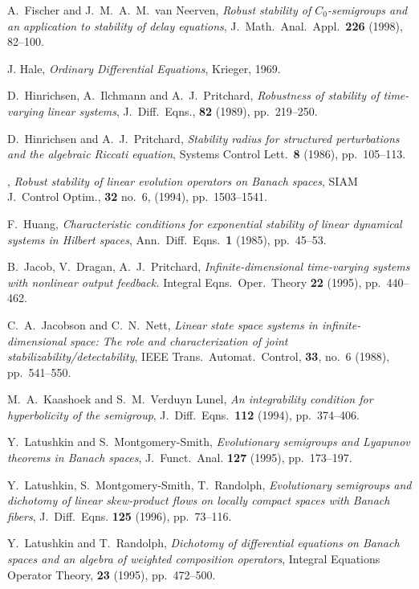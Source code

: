 \documentclass[10pt,psamsfonts,leqno]{siamltex}
\begin{document}
\begin{thebibliography}{99}
 {\sc A.~Fischer and J.~M.~A.~M.~van Neerven},
{\em Robust stability of $C_0$-semigroups and an application to
stability
of delay equations}, J.~Math.~Anal.~Appl.~{\bf 226} (1998), 82--100.

 {\sc J. Hale}, {\em Ordinary Differential
Equations}, Krieger, 1969.

 {\sc D.~Hinrichsen, A.~Ilchmann and A.~J.~Pritchard},
{\em Robustness of stability of time-varying linear systems},
J.~Diff.~Eqns., {\bf 82} (1989), pp.~219--250.

 {\sc D.~Hinrichsen and A.~J.~Pritchard}, {\em Stability
radius for structured perturbations and the algebraic Riccati equation},
Systems Control Lett.~{\bf 8} (1986), pp.~105--113.

\sameauthor,
{\em Robust stability of
linear evolution operators on Banach spaces},
SIAM J.~Control Optim.,
{\bf 32} no.~6, (1994), pp.~1503--1541.

 {\sc F.~Huang}, {\em Characteristic conditions for
exponential stability
of linear dynamical systems in Hilbert spaces},
Ann.~Diff.~Eqns.~{\bf 1} (1985), pp.~45--53.

 {\sc B.~Jacob, V.~Dragan, A.~J.~Pritchard},
{\em Infinite-dimensional time-varying systems with nonlinear output
feedback.}
Integral Eqns.~Oper.~Theory {\bf 22} (1995),  pp.~440--462.

 {\sc C.~A.~Jacobson and C.~N.~Nett}, {\em Linear state
space
systems in infinite-dimensional space{\rm:} The role and
characterization of
joint stabilizability/detectability}, IEEE Trans.~Automat.~Control,
{\bf 33}, no.~6 (1988), pp.~541--550.

 {\sc M.~A.~Kaashoek and S.~M.~Verduyn
Lunel}, {\em An integrability condition for
hyperbolicity of the semigroup}, J.~Diff.~Eqns.~{\bf 112}
(1994), pp.~374--406.

 {\sc Y.~Latushkin and S.~Montgomery-Smith},
{\em Evolutionary semigroups and Lyapunov theorems in Banach spaces},
J.~Funct.~Anal. {\bf 127} (1995), pp.~173--197.

 {\sc Y.~Latushkin, S.~Montgomery-Smith,
T.~Randolph}, {\em Evolutionary semigroups and dichotomy of linear
 skew-product flows on locally compact spaces with Banach fibers},
J.~Diff.~Eqns.
 {\bf 125} (1996), pp.~73--116.

 {\sc Y.~Latushkin and T.~Randolph},
{\em Dichotomy of differential equations on Banach spaces and an
algebra of weighted composition operators},
Integral Equations Operator Theory, {\bf 23} (1995), pp.~472--500.


\end{thebibliography}
\end{document}
